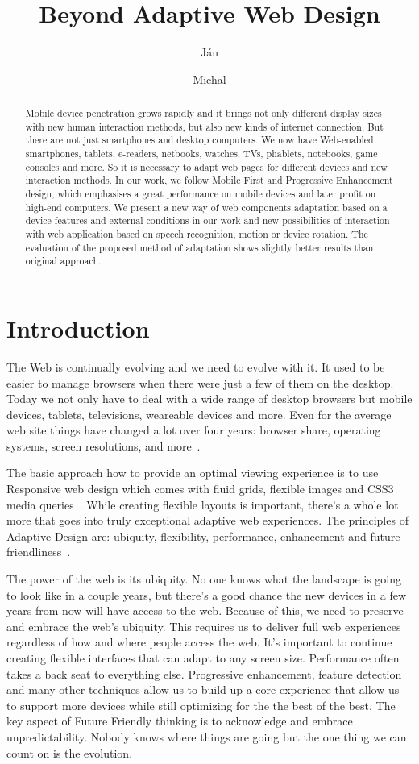 \documentclass{iitsrc}
\title{Beyond Adaptive Web Design}
\author{Ján}{Antala}
\author{Michal}{Čerňanský}
\begin{document}
\begin{abstract}
Mobile device penetration grows rapidly and it brings not only different display sizes with new human interaction methods, but also new kinds of internet connection. But there are not just smartphones and desktop computers. We now have Web-enabled smartphones, tablets, e-readers, netbooks, watches, TVs, phablets, notebooks, game consoles and more. So it is necessary to adapt web pages for different devices and new interaction methods. In our work, we follow Mobile First and Progressive Enhancement design, which emphasises a great performance on mobile devices and later profit on high-end computers. We present a new way of web components adaptation based on a device features and external conditions in our work and new possibilities of interaction with web application based on speech recognition, motion or device rotation. The evaluation of the proposed method of adaptation shows slightly better results than original approach.
\end{abstract}

\section{Introduction}

The Web is continually evolving and we need to evolve with it. It used to be easier to manage browsers when there were just a few of them on the desktop. Today we not only have to deal with a wide range of desktop browsers but mobile devices, tablets, televisions, weareable devices and more. Even for the average web site things have changed a lot over four years: browser share, operating systems, screen resolutions, and more~\cite{ui17}.

The basic approach how to provide an optimal viewing experience is to use Responsive web design which comes with fluid grids, flexible images and CSS3 media queries~\cite{responsive}. While creating flexible layouts is important, there’s a whole lot more that goes into truly exceptional adaptive web experiences. The principles of Adaptive Design are: ubiquity, flexibility, performance, enhancement and future-friendliness~\cite{adaptivesxsw}.

The power of the web is its ubiquity. No one knows what the landscape is going to look like in a couple years, but there’s a good chance the new devices in a few years from now will have access to the web. Because of this, we need to preserve and embrace the web’s ubiquity. This requires us to deliver full web experiences regardless of how and where people access the web. It's important to continue creating flexible interfaces that can adapt to any screen size. Performance often takes a back seat to everything else. Progressive enhancement, feature detection and many other techniques allow us to build up a core experience that allow us to support more devices while still optimizing for the the best of the best. The key aspect of Future Friendly thinking is to acknowledge and embrace unpredictability. Nobody knows where things are going but the one thing we can count on is the evolution.
\end{document}
